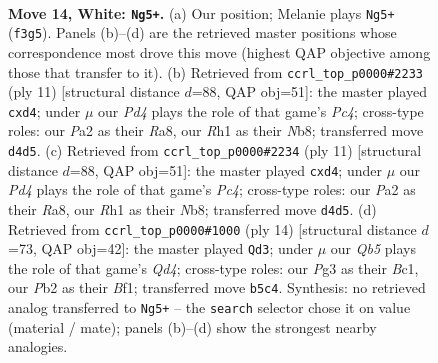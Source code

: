 \documentclass[11pt]{article}
\begin{document}
\begin{figure}[p]
\label{fig:thought-m24}
\end{figure}

\clearpage

\begin{figure}[p]\centering
\begin{subfigure}{0.46\textwidth}\centering
\resizebox{\linewidth}{!}{%
\newchessgame
\chessboard[
  setfen={r1b2r2/p1ppqppk/2n1pn2/1Qp4p/3P4/2B2NP1/PP1KPP1P/R4B1R w - - 0 14},
  showmover=false,
  pgfstyle=straightmove, color=movearrow, markmove={f3-g5}
]}
\caption{}
\end{subfigure}\hfill
\begin{subfigure}{0.46\textwidth}\centering
\resizebox{\linewidth}{!}{%
\newchessgame
\chessboard[
  setfen={rnb1kb1r/pp3ppp/4pn2/2pq4/3P4/2P1BN2/PP3PPP/RN1QKB1R b KQkq - 2 6},
  showmover=false,
  pgfstyle=straightmove, color=movearrow, markmove={c5-d4}
]}
\caption{}
\end{subfigure}
\\[4pt]
\begin{subfigure}{0.46\textwidth}\centering
\resizebox{\linewidth}{!}{%
\newchessgame
\chessboard[
  setfen={rnb1kb1r/pp3ppp/4pn2/2pq4/3P4/2P1BN2/PP3PPP/RN1QKB1R b KQkq - 2 6},
  showmover=false,
  pgfstyle=straightmove, color=movearrow, markmove={c5-d4}
]}
\caption{}
\end{subfigure}\hfill
\begin{subfigure}{0.46\textwidth}\centering
\resizebox{\linewidth}{!}{%
\newchessgame
\chessboard[
  setfen={r1bqk2r/pp1p1ppp/2n1pn2/8/2PQ4/P4N2/1P2PPPP/R1B1KB1R w KQkq - 3 8},
  showmover=false,
  pgfstyle=straightmove, color=movearrow, markmove={d4-d3}
]}
\caption{}
\end{subfigure}
\caption{\textbf{Move 14, White: \texttt{Ng5+}.} (a) Our position; Melanie plays \texttt{Ng5+} (\texttt{f3g5}). Panels (b)--(d) are the retrieved master positions whose correspondence most drove this move (highest QAP objective among those that transfer to it). (b) Retrieved from \texttt{ccrl\_top\_p0000\#2233} (ply 11) [structural distance $d$=88, QAP obj=51]: the master played \texttt{cxd4}; under $\mu$ our \emph{Pd4} plays the role of that game's \emph{Pc4}; cross-type roles: our \emph{P}a2 as their \emph{R}a8, our \emph{R}h1 as their \emph{N}b8; transferred move \texttt{d4d5}. (c) Retrieved from \texttt{ccrl\_top\_p0000\#2234} (ply 11) [structural distance $d$=88, QAP obj=51]: the master played \texttt{cxd4}; under $\mu$ our \emph{Pd4} plays the role of that game's \emph{Pc4}; cross-type roles: our \emph{P}a2 as their \emph{R}a8, our \emph{R}h1 as their \emph{N}b8; transferred move \texttt{d4d5}. (d) Retrieved from \texttt{ccrl\_top\_p0000\#1000} (ply 14) [structural distance $d$=73, QAP obj=42]: the master played \texttt{Qd3}; under $\mu$ our \emph{Qb5} plays the role of that game's \emph{Qd4}; cross-type roles: our \emph{P}g3 as their \emph{B}c1, our \emph{P}b2 as their \emph{B}f1; transferred move \texttt{b5c4}. Synthesis: no retrieved analog transferred to \texttt{Ng5+} -- the \texttt{search} selector chose it on value (material / mate); panels (b)--(d) show the strongest nearby analogies.}
\label{fig:thought-m26}
\end{figure}
\end{document}
